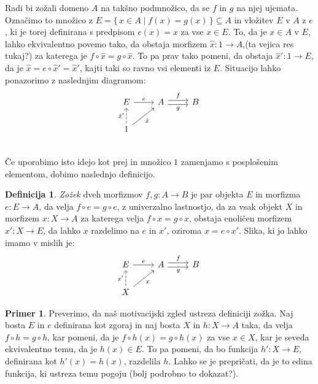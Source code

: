 \documentclass[12pt,a4paper]{book}
\theoremstyle{definition}
\newtheorem{definicija}{Definicija}[chapter]
\theoremstyle{plain}
\theoremstyle{definition}
\newtheorem{primer}{Primer}[section]
\theoremstyle{remark}
\renewcommand{\set}[1]{\{\,#1\,\}}
\begin{document}
Radi bi zožali domeno $A$ na takšno podmnožico, da se $f$ in $g$ na njej ujemata. Označimo to množico z $E = \set{x \in A \mid f(x) = g(x)} \subseteq A$ in vložitev $E$ v $A$ z $e$, ki je torej definirana s predpisom $e(x) = x$ za vse $x \in E$. To, da je $x \in A$ v $E$, lahko ekvivalentno povemo tako, da obstaja morfizem $\hat{x} : 1 \to A$,(ta vejica res tukaj?) za katerega je $f \circ \hat{x} = g \circ \hat{x}$. To pa prav tako pomeni, da obstaja $\hat{x}' : 1 \to E$, da je $\hat{x} = e \circ \hat{x}' = \hat{x}'$, kajti taki so ravno vsi elementi iz $E$. Situacijo lahko ponazorimo z naslednjim diagramom:
$$\begin{tikzcd}
E \ar[r, "e"] & A \ar[r, shift left, "f"] \ar[r, shift right, "g"'] & B \\
1 \ar[u, dashed, "\hat{x}'"] \ar[ur, "\hat{x}"'] \\
\end{tikzcd}$$
Če uporabimo isto idejo kot prej in množico $1$ zamenjamo s posplošenim elementom, dobimo naslednjo definicijo.

\begin{definicija}
\emph{Zožek} dveh morfizmov $f, g : A \to B$ je par objekta $E$ in morfizma $e : E \to A$, da velja $f \circ e = g \circ e$, z univerzalno lastnostjo, da za vsak objekt $X$ in morfizem $x : X \to A$ za katerega velja $f \circ x = g \circ x$, obstaja enoličen morfizem $x' : X \to E$, da lahko $x$ razdelimo na $e$ in $x'$, oziroma $x = e \circ x'$.
Slika, ki jo lahko imamo v mislih je:
$$\begin{tikzcd}
E \ar[r, "e"] & A \ar[r, shift left, "f"] \ar[r, shift right, "g"'] & B \\
X \ar[u, dashed, "x'"] \ar[ur, "x"']
\end{tikzcd}$$

\end{definicija}

\begin{primer}
Preverimo, da naš motivacijski zgled ustreza definiciji zožka. Naj bosta $E$ in $e$ definirana kot zgoraj in naj bosta $X$ in $h:X \to A$ taka, da velja $f \circ h = g \circ h$, kar pomeni, da je $f \circ h(x) = g \circ  h(x)$ za vse $x \in X$, kar je seveda ekvivalentno temu, da je $h(x) \in E$. To pa pomeni, da bo funkcija $h' : X \to E$, definirana kot $h'(x) = h(x)$, razdelila $h$. Lahko se je prepričati, da je to edina funkcija, ki ustreza temu pogoju (bolj podrobno to dokazat?).
\end{primer}
\end{document}
